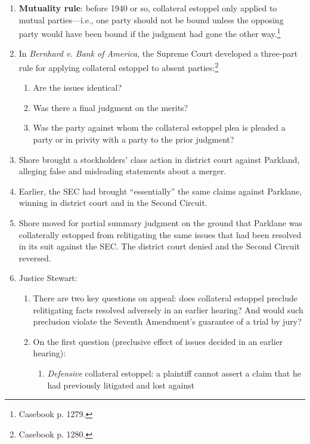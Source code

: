 \begin{enumerate}
    \item \textbf{Mutuality rule}: before 1940 or so, collateral estoppel only 
    applied to mutual parties---i.e., one party should not be bound unless the 
    opposing party would have been bound if the judgment had gone the other 
    way.\footnote{Casebook p. 1279.}
    \item In \emph{Bernhard v. Bank of America}, the Supreme Court developed a 
    three-part rule for applying collateral estoppel to absent 
    parties:\footnote{Casebook p. 1280.}
    \begin{enumerate}
        \item Are the issues identical?
        \item Was there a final judgment on the merits?
        \item Was the party against whom the collateral estoppel plea is 
        pleaded a party or in privity with a party to the prior judgment?
    \end{enumerate}
    \item Shore brought a stockholders' class action  in district court 
    against Parkland, alleging false and misleading statements about a merger.
    \item Earlier, the SEC had brought ``essentially'' the same claims against 
    Parklane, winning in district court and in the Second Circuit.
    \item Shore moved for partial summary judgment on the ground that Parklane 
    was collaterally estopped from relitigating the same issues that had been 
    resolved in its suit against the SEC. The district court denied and the 
    Second Circuit reversed.
    \item Justice Stewart:
    \begin{enumerate}
        \item There are two key questions on appeal: does collateral estoppel 
        preclude relitigating facts resolved adversely in an earlier hearing? 
        And would such preclusion violate the Seventh Amendment's guarantee of 
        a trial by jury?
        \item On the first question (preclusive effect of issues decided in an 
        earlier hearing):
        \begin{enumerate}
            \item \emph{Defensive} collateral estoppel: a plaintiff cannot 
            assert a claim that he had previously litigated and lost against 

\end{enumerate}
\end{enumerate}
\end{enumerate}
